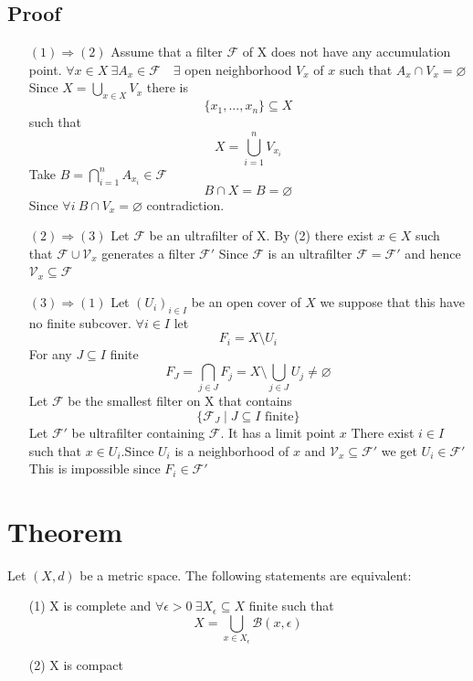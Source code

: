 \documentclass{book}
\begin{document}
\subsection*{Proof}
\begin{itemize}
    \item[$(1)\Rightarrow(2)$]Assume that a filter $\mathcal{F}$ of X does not have any accumulation point. $\forall x\in X\ \exists A_x\in \mathcal{F}\quad \exists$ open neighborhood $V_x$ of $x$ such that $A_x\cap V_x=\varnothing$ Since $X=\bigcup\limits_{x\in X}V_x$ there is $$\{x_1,...,x_n\}\subseteq X$$ such that $$X=\bigcup_{i=1}^nV_{x_i}$$Take $B=\bigcap\limits_{i=1}^nA_{x_i}\in \mathcal{F}$$$B\cap X=B=\varnothing$$Since $\forall i\ B\cap V_x=\varnothing$ contradiction.
    \item[$(2)\Rightarrow(3)$]Let $\mathcal{F}$ be an ultrafilter of X. By (2) there exist $x\in X$ such that $\mathcal{F}\cup\mathcal{V}_x$ generates a filter $\mathcal{F}'$ Since $\mathcal{F}$ is an ultrafilter $\mathcal{F}=\mathcal{F}'$ and hence $\mathcal{V}_x\subseteq\mathcal{F}$
    \item[$(3)\Rightarrow(1)$]Let $(U_i)_{i\in I}$ be an open cover of $X$ we suppose that this have no finite subcover.
    $\forall i\in I$ let $$F_i=X\setminus U_i$$For any $J\subseteq I$ finite$$F_J=\bigcap\limits_{j\in J}F_j=X\setminus\bigcup\limits_{j\in J}U_j\neq\varnothing$$
    Let $\mathcal{F}$ be the smallest filter on X that contains$$\{\mathcal{F}_J\mid J\subseteq I\text{ finite}\}$$
    Let $\mathcal{F}'$ be ultrafilter containing $\mathcal{F}$. It has a limit point $x$ There exist $i\in I$ such that $x\in U_i$.Since $U_i$ is a neighborhood of $x$ and $\mathcal{V}_x\subseteq \mathcal{F}'$ we get $U_i\in \mathcal{F}'$ This is impossible since $F_i\in \mathcal{F}'$
\end{itemize}
\section{Theorem}
Let $(X,d)$ be a metric space. The following statements are equivalent:
\begin{itemize}
    \item[(1)]X is complete and $\forall \epsilon>0\ \exists X_\epsilon\subseteq X$ finite such that $$X=\bigcup\limits_{x\in X_\epsilon}\mathcal{B}(x,\epsilon)$$
    \item[(2)] X is compact
\end{itemize}
\end{document}
